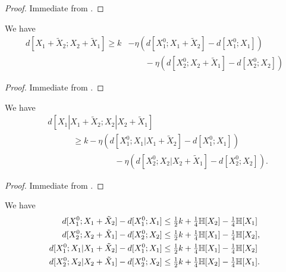 \begin{proof} \leanok  Immediate from .
\end{proof}

\begin{lemma}\label{first-dist-sum}
  \leanok
  We have
  \begin{align*}
    d[X_1+\tilde X_2; X_2+\tilde X_1] \geq k &- \eta (d[X^0_1; X_1+\tilde X_2] - d[X^0_1; X_1]) \\& \qquad- \eta (d[X^0_2; X_2+\tilde X_1] - d[X^0_2; X_2])
  \end{align*}
\end{lemma}


\begin{proof}\leanok Immediate from .
\end{proof}

\begin{lemma}\label{first-cond}
  \leanok
  We have
  \begin{align*}
    & d[X_1|X_1+\tilde X_2; X_2|X_2+\tilde X_1]  \\  & \qquad\quad \geq k - \eta (d[X^0_1; X_1 | X_1 + \tilde X_2] - d[X^0_1; X_1]) \\
    & \qquad\qquad\qquad\qquad  - \eta(d[X^0_2; X_2 | X_2 + \tilde X_1] - d[X^0_2; X_2]).
  \end{align*}
\end{lemma}

\begin{proof}\leanok Immediate from .
\end{proof}

\begin{lemma}\label{first-upper}\leanok
  We have
  \begin{align*}
    d[X^0_1; X_1+\tilde X_2] - d[X^0_1; X_1] &\leq \tfrac{1}{2} k + \tfrac{1}{4} \mathbb{H}[X_2] - \tfrac{1}{4} \mathbb{H}[X_1]\\
    d[X^0_2;X_2+\tilde X_1] - d[X^0_2; X_2] &\leq \tfrac{1}{2} k + \tfrac{1}{4} \mathbb{H}[X_1] - \tfrac{1}{4} \mathbb{H}[X_2], \\
    d[X_1^0;X_1|X_1+\tilde X_2] - d[X_1^0;X_1] &\leq \tfrac{1}{2} k + \tfrac{1}{4} \mathbb{H}[X_1] - \tfrac{1}{4} \mathbb{H}[X_2]  \\
    d[X_2^0; X_2|X_2+\tilde X_1] - d[X_2^0; X_2] &\leq \tfrac{1}{2}k + \tfrac{1}{4} \mathbb{H}[X_2] - \tfrac{1}{4} \mathbb{H}[X_1].
  \end{align*}
\end{lemma}

